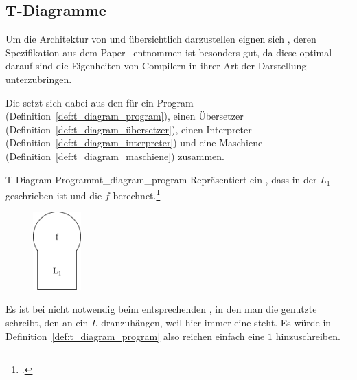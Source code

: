 
\subsection{T-Diagramme}
Um die Architektur von  und  übersichtlich darzustellen eignen sich , deren Spezifikation aus dem Paper~\cite{earley_formalism_1970} entnommen ist besonders gut, da diese optimal darauf  sind die Eigenheiten von Compilern in ihrer Art der Darstellung unterzubringen.

Die  setzt sich dabei aus den  für ein Program (Definition~\ref{def:t_diagram_program}), einen Übersetzer (Definition~\ref{def:t_diagram_übersetzer}), einen Interpreter (Definition~\ref{def:t_diagram_interpreter}) und eine Maschiene (Definition~\ref{def:t_diagram_maschiene}) zusammen.

\begin{Definition}{T-Diagram Programm}{t_diagram_program}
  Repräsentiert ein , dass in der  $L_1$ geschrieben ist und die  $f$ berechnet.\footcite{earley_formalism_1970}
  \begin{figure}[H]
    \centering
    \includegraphics[height=3cm]{./figures/programm.png}
  \end{figure}
\end{Definition}

\begin{Special_Paragraph}
  Es ist bei  nicht notwendig beim entsprechenden , in den man die genutzte  schreibt, den  an ein $L$ dranzuhängen, weil hier immer eine  steht. Es würde in Definition~\ref{def:t_diagram_program} also reichen einfach eine $1$ hinzuschreiben.
\end{Special_Paragraph}

